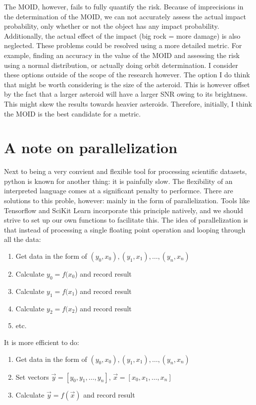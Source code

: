 \documentclass[a4paper,10pt]{article}
\begin{document}
The MOID, however, fails to fully quantify the risk. Because of imprecisions in the determination of the MOID, we can not accurately assess the actual impact probability, only whether or not the object has any impact probability. Additionally, the actual effect of the impact (big rock = more damage) is also neglected. These problems could be resolved using a more detailed metric. For example, finding an accuracy in the value of the MOID and assessing the risk using a normal distribution, or actually doing orbit determination. I consider these options outside of the scope of the research however. The option I do think that might be worth considering is the size of the asteroid. This is however offset by the fact that a larger asteroid will have a larger SNR owing to its brightness. This might skew the results towards heavier asteroids. Therefore, initially, I think the MOID is the best candidate for a metric.

\section{A note on parallelization}
Next to being a very convient and flexible tool for processing scientific datasets, python is known for another thing: it is painfully slow. The flexibility of an interpreted language comes at a significant penalty to performce. There are solutions to this proble, however: mainly in the form of parallelization. Tools like Tensorflow and SciKit Learn incorporate this principle natively, and we should strive to set up our own functions to facilitate this. The idea of parallelization is that instead of processing a single floating point operation and looping through all the data:
\begin{enumerate}
 \item Get data in the form of $(y_0, x_0), (y_1, x_1), \hdots, (y_n, x_n)$
 \item Calculate $y_0 = f(x_0$) and record result
 \item Calculate $y_1 = f(x_1$) and record result
 \item Calculate $y_2 = f(x_2$) and record result
 \item etc.
\end{enumerate}
It is more efficient to do:
\begin{enumerate}
 \item Get data in the form of $(y_0, x_0), (y_1, x_1), \hdots, (y_n, x_n)$
 \item Set vectors $\vec{y} = [y_0, y_1, \hdots, y_n]$, $\vec{x} = [x_0, x_1, \hdots, x_n]$
 \item Calculate $\vec{y} = f(\vec{x})$ and record result
\end{enumerate}
\end{document}
